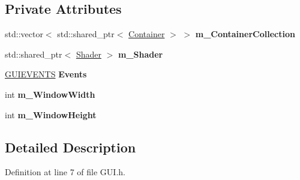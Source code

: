 \subsection*{Private Attributes}
\begin{DoxyCompactItemize}
\item 
std\+::vector$<$ std\+::shared\+\_\+ptr$<$ \hyperlink{class_container}{Container} $>$ $>$ {\bfseries m\+\_\+\+Container\+Collection}\hypertarget{class_g_u_i_a35b7b035ba9ffe52e98216cb14cf0108}{}\label{class_g_u_i_a35b7b035ba9ffe52e98216cb14cf0108}

\item 
std\+::shared\+\_\+ptr$<$ \hyperlink{class_shader}{Shader} $>$ {\bfseries m\+\_\+\+Shader}\hypertarget{class_g_u_i_a75e3b7c07e1559e346680326a439fe74}{}\label{class_g_u_i_a75e3b7c07e1559e346680326a439fe74}

\item 
\hyperlink{struct_g_u_i_e_v_e_n_t_s}{G\+U\+I\+E\+V\+E\+N\+TS} {\bfseries Events}\hypertarget{class_g_u_i_aa4806d12dd478a1cacd0a20b59d22298}{}\label{class_g_u_i_aa4806d12dd478a1cacd0a20b59d22298}

\item 
int {\bfseries m\+\_\+\+Window\+Width}\hypertarget{class_g_u_i_a0a5ea53e7f6ce833842c6f6e7735ece3}{}\label{class_g_u_i_a0a5ea53e7f6ce833842c6f6e7735ece3}

\item 
int {\bfseries m\+\_\+\+Window\+Height}\hypertarget{class_g_u_i_a2d95e4f6e7347c11197f2ec1aadf1d92}{}\label{class_g_u_i_a2d95e4f6e7347c11197f2ec1aadf1d92}

\end{DoxyCompactItemize}


\subsection{Detailed Description}


Definition at line 7 of file G\+U\+I.\+h.


